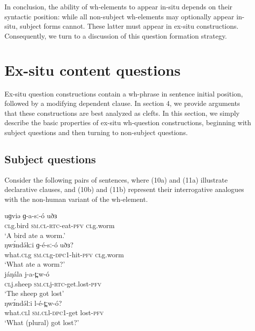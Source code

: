 In conclusion, the ability of wh-elements to appear in-situ depends on their syntactic position: while all non-subject wh-elements may optionally appear in-situ, subject forms cannot. These latter must appear in ex-situ constructions. Consequently, we turn to a discussion of this question formation strategy.


\section{Ex-situ content questions}\label{sec:ch18:ex}

Ex-situ question constructions contain a wh-phrase in sentence initial position, followed by a modifying dependent clause. In section 4, we provide arguments that these constructions are best analyzed as clefts. In this section, we simply describe the basic properties of ex-situ wh-question constructions, beginning with subject questions and then turning to non-subject questions. 

\subsection{Subject questions}

Consider the following pairs of sentences, where (10a) and (11a) illustrate declarative clauses, and (10b) and (11b) represent their interrogative analogues with the non-human variant of the wh-element.

\ea
\ea \gll	uɡviə	ɡ-a-sː-ó	uðɜ\\
		\textsc{cl}g.bird	\textsc{sm.cl}-\textsc{rtc}-eat-\textsc{pfv}	\textsc{cl}g.worm\\
\trans		‘A bird ate a worm.’\\
\ex \gll	ŋwɜ́ndə́kːi	ɡ-é-sː-ó	uðɜ?		\\
		what.\textsc{cl}g	\textsc{sm.cl}g-\textsc{dpc}1-hit-\textsc{pfv}	\textsc{cl}g.worm\\
\trans		‘What ate a worm?’\\
\z
\z
\ea
\ea \gll	jáŋála	j-a-t̪ːw-ó	\\	
		\textsc{cl}j.sheep	\textsc{sm.cl}j-\textsc{rtc}-get.lost-\textsc{pfv}	\\
\trans		‘The sheep got lost’\\
\ex \gll	ŋwɜ́ndə́lːi	l-é-t̪ːw-ó?\\		
		what.\textsc{cl}l	\textsc{sm.cl}l-\textsc{dpc}1-get lost-\textsc{pfv}	\\
\trans		‘What (plural) got lost?’	\\
\z
\z

